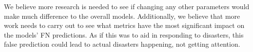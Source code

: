 \documentclass[a4paper,10pt]{article}
\begin{document}
	We believe more research is needed to see if changing any other parameters would make much difference to the overall models. Additionally, we believe that more work needs to carry out to see what metrics have the most significant impact on the models' FN predictions. As if this was to aid in responding to disasters, this false prediction could lead to actual disasters happening, not getting attention.
	
\medskip
\newpage
	
	




\end{document}
